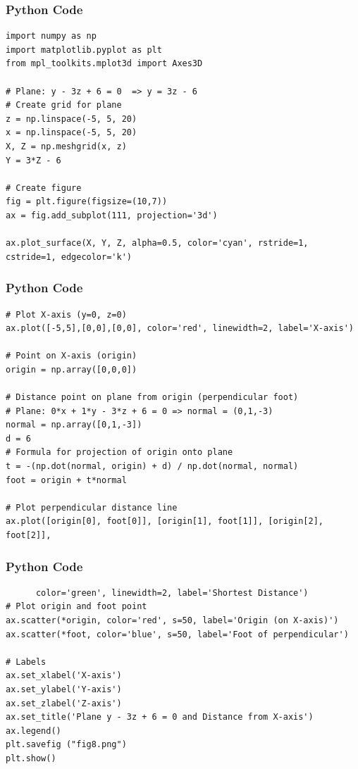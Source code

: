 \documentclass{beamer}
\begin{document}
\begin{frame}[fragile]
    \frametitle{Python Code}
    \begin{lstlisting}
import numpy as np
import matplotlib.pyplot as plt
from mpl_toolkits.mplot3d import Axes3D

# Plane: y - 3z + 6 = 0  => y = 3z - 6
# Create grid for plane
z = np.linspace(-5, 5, 20)
x = np.linspace(-5, 5, 20)
X, Z = np.meshgrid(x, z)
Y = 3*Z - 6

# Create figure
fig = plt.figure(figsize=(10,7))
ax = fig.add_subplot(111, projection='3d')

ax.plot_surface(X, Y, Z, alpha=0.5, color='cyan', rstride=1, cstride=1, edgecolor='k')
\end{lstlisting}
\end{frame}


\begin{frame}[fragile]
    \frametitle{Python Code}
    \begin{lstlisting}
# Plot X-axis (y=0, z=0)
ax.plot([-5,5],[0,0],[0,0], color='red', linewidth=2, label='X-axis')

# Point on X-axis (origin)
origin = np.array([0,0,0])

# Distance point on plane from origin (perpendicular foot)
# Plane: 0*x + 1*y - 3*z + 6 = 0 => normal = (0,1,-3)
normal = np.array([0,1,-3])
d = 6
# Formula for projection of origin onto plane
t = -(np.dot(normal, origin) + d) / np.dot(normal, normal)
foot = origin + t*normal

# Plot perpendicular distance line
ax.plot([origin[0], foot[0]], [origin[1], foot[1]], [origin[2], foot[2]],
\end{lstlisting}
\end{frame}


\begin{frame}[fragile]
    \frametitle{Python Code}
    \begin{lstlisting}
      color='green', linewidth=2, label='Shortest Distance')
# Plot origin and foot point
ax.scatter(*origin, color='red', s=50, label='Origin (on X-axis)')
ax.scatter(*foot, color='blue', s=50, label='Foot of perpendicular')

# Labels
ax.set_xlabel('X-axis')
ax.set_ylabel('Y-axis')
ax.set_zlabel('Z-axis')
ax.set_title('Plane y - 3z + 6 = 0 and Distance from X-axis')
ax.legend()
plt.savefig ("fig8.png") 
plt.show()
\end{lstlisting}
\end{frame}
\end{document}

